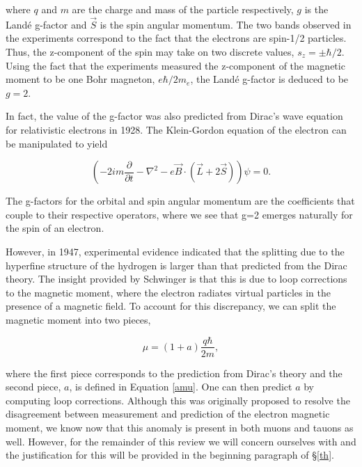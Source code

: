 \documentclass{article}
\numberwithin{equation}{section} %
\begin{document}
\noindent where $q$ and $m$ are the charge and mass of the particle respectively, $g$ is the Land\'e g-factor and $\vec{S}$ is the spin angular momentum. The two bands observed in the experiments correspond to the fact that the electrons are spin-1/2 particles. Thus, the z-component of the spin may take on two discrete values, $s_z=\pm \hbar/2$. Using the fact that the experiments measured the z-component of the magnetic moment to be one Bohr magneton, $e\hbar/2m_e$, the Land\'e g-factor is deduced to be $g=2$.

In fact, the value of the g-factor was also predicted from Dirac's wave equation for relativistic electrons in 1928. The Klein-Gordon equation of the electron can be manipulated\cite{zee} to yield 

\begin{equation}
\left(-2im\frac{\partial}{\partial t} - \nabla^2 - e\vec{B}\cdot (\vec{L} + 2 \vec{S}) \right)\psi=0. 
\label{KGeq for rel e}
\end{equation}

\noindent The g-factors for the orbital and spin angular momentum are the coefficients that couple to their respective operators, where we see that g=2 emerges naturally for the spin of an electron.

However, in 1947, experimental evidence indicated that the splitting due to the hyperfine structure of the hydrogen is larger than that predicted from the Dirac theory\cite{lehnerg2}. The insight provided by Schwinger is that this is due to loop corrections to the magnetic moment, where the electron radiates virtual particles in the presence of a magnetic field. To account for this discrepancy, we can split the magnetic moment into two pieces,

\begin{equation}
\mu = (1+a)\frac{q\hbar}{2m},
\end{equation}

\noindent where the first piece corresponds to the prediction from Dirac's theory and the second piece, $a$, is defined in Equation \ref{amu}. One can then predict $a$ by computing loop corrections. Although this was originally proposed to resolve the disagreement between measurement and prediction of the electron magnetic moment, we know now that this anomaly is present in both muons and tauons as well. However, for the remainder of this review we will concern ourselves with \amu and the justification for this will be provided in the beginning paragraph of \S\ref{th}.
\end{document}
